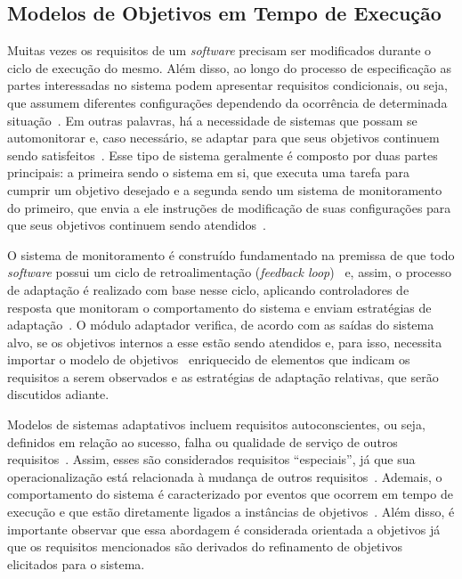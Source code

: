 
\subsection{Modelos de Objetivos em Tempo de Execução}
\label{sec-referencial-engenharia-objetivos-runtime}

Muitas vezes os requisitos de um \textit{software} precisam ser modificados durante o ciclo de execução do mesmo. Além disso, ao longo do processo de especificação as partes interessadas no sistema podem apresentar requisitos condicionais, ou seja, que assumem diferentes configurações dependendo da ocorrência de determinada situação~\cite{souza2012requirement}. Em outras palavras, há a necessidade de sistemas que possam se automonitorar e, caso necessário, se adaptar para que seus objetivos continuem sendo satisfeitos~\cite{dalpiaz2013runtime}. Esse tipo de sistema geralmente é composto por duas partes principais: a primeira sendo o sistema em si, que executa uma tarefa para cumprir um objetivo desejado e a segunda sendo um sistema de monitoramento do primeiro, que envia a ele instruções de modificação de suas configurações para que seus objetivos continuem sendo atendidos~\cite{souza2013awareness}. 

O sistema de monitoramento é construído fundamentado na premissa de que todo \textit{software} possui um ciclo de retroalimentação (\textit{feedback loop})~\cite{brun2009engineering} e, assim, o processo de adaptação é realizado com base nesse ciclo, aplicando controladores de resposta que monitoram o comportamento do sistema e enviam estratégias de adaptação~\cite{souza2013awareness}. O módulo adaptador verifica, de acordo com as saídas do sistema alvo, se os objetivos internos a esse estão sendo atendidos e, para isso, necessita importar o modelo de objetivos~\cite{souza2013awareness} enriquecido de elementos que indicam os requisitos a serem observados e as estratégias de adaptação relativas, que serão discutidos adiante.

Modelos de sistemas adaptativos incluem requisitos autoconscientes, ou seja, definidos em relação ao sucesso, falha ou qualidade de serviço de outros requisitos~\cite{souza2013awareness}. Assim, esses são considerados requisitos ``especiais'', já que sua operacionalização está relacionada à mudança de outros requisitos~\cite{souza2012requirement}. Ademais, o comportamento do sistema é caracterizado por eventos que ocorrem em tempo de execução e que estão diretamente ligados a instâncias de objetivos~\cite{dalpiaz2013runtime}. Além disso, é importante observar que essa abordagem é considerada orientada a objetivos já que os requisitos mencionados são derivados do refinamento de objetivos elicitados para o sistema.

